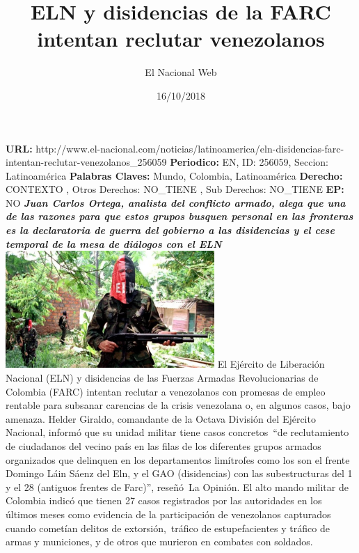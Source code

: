 \documentclass{article}%
\title{\textbf{ELN y disidencias de la FARC intentan reclutar venezolanos}}%
\author{El Nacional Web}%
\date{16/10/2018}%
\begin{document}
%
\normalsize%
\maketitle%
\textbf{URL: }%
http://www.el{-}nacional.com/noticias/latinoamerica/eln{-}disidencias{-}farc{-}intentan{-}reclutar{-}venezolanos\_256059\newline%
%
\textbf{Periodico: }%
EN, %
ID: %
256059, %
Seccion: %
Latinoamérica\newline%
%
\textbf{Palabras Claves: }%
Mundo, Colombia, Latinoamérica\newline%
%
\textbf{Derecho: }%
CONTEXTO%
, Otros Derechos: %
NO\_TIENE%
, Sub Derechos: %
NO\_TIENE%
\newline%
%
\textbf{EP: }%
NO\newline%
\newline%
%
\textbf{\textit{Juan Carlos Ortega, analista del conflicto armado, alega que una de las razones para que estos grupos busquen personal en las fronteras es la declaratoria de guerra del gobierno a las disidencias y el cese temporal de la mesa de diálogos con el ELN}}%
\newline%
\newline%
%
\includegraphics[width=300px]{177.jpg}%
\newline%
%
El Ejército de Liberación Nacional (ELN) y disidencias de las Fuerzas Armadas Revolucionarias de Colombia (FARC) intentan reclutar a venezolanos con promesas de empleo rentable para subsanar carencias de la crisis venezolana o, en algunos casos, bajo amenaza.%
\newline%
%
Helder Giraldo, comandante de la Octava División del Ejército Nacional, informó que su unidad militar tiene casos concretos~“de reclutamiento de ciudadanos del vecino país en las filas de los diferentes grupos armados organizados que delinquen en los departamentos limítrofes como los son el frente Domingo Láin Sáenz del Eln, y el GAO (disidencias) con las subestructuras del 1 y el 28 (antiguos frentes de Farc)”, reseñó~La Opinión.%
\newline%
%
El alto mando militar de Colombia indicó que tienen 27 casos registrados por las autoridades en los últimos meses como evidencia de la participación de venezolanos capturados cuando cometían delitos de extorsión,~tráfico de estupefacientes y tráfico de armas y municiones, y de otros que murieron en combates con soldados.%
\end{document}
